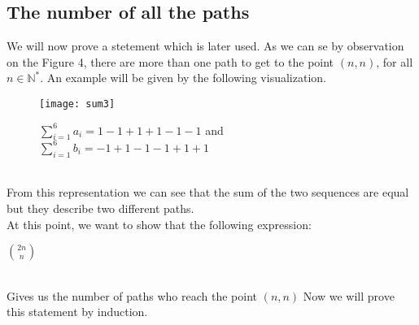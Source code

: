 \documentclass[a4paper,12pt,oneside]{article}
\begin{document}
\subsection{The number of all the paths}
We will now prove a stetement which is later used. As we can se by observation on the Figure 4, there are more than one path to get to the point $(n,n)$, for all $n\in\mathbb{N^*}$. An example will be given by the following visualization.
\begin{figure}[h]
\centering
\texttt{[image: sum3]}
\caption{$\sum_{i=1}^{6}a_{i}=1-1+1+1-1-1$ and $\sum_{i=1}^{6}b_{i}=-1+1-1-1+1+1$}
\end{figure}
\vspace{0.3cm}\\ From this representation we can see that the sum of the two sequences are equal but they describe two different paths.\\At this point, we want to show that the following expression:
\begin{centering}
 $\binom{2n}{n}$
\end{centering}
\vspace{0.3cm}\\ Gives us the number of paths who reach the point $(n,n)$
Now we will prove this statement by induction.
\end{document}
